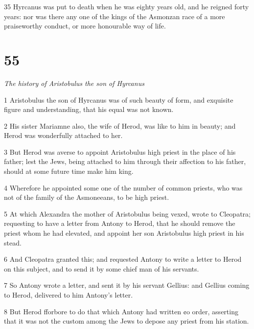 \par 35 Hyrcanus was put to death when he was eighty years old, and he reigned forty years: nor was there any one of the kings of the Asmonzan race of a more praiseworthy conduct, or more honourable way of life. 

\chapter{55}

\par \textit{The history of Aristobulus the son of Hyrcanus}

\par 1 Aristobulus the son of Hyrcanus was of such beauty of form, and exquisite figure and understanding, that his equal was not known. 

\par 2 His sister Mariamne also, the wife of Herod, was like to him in beauty; and Herod was wonderfully attached to her. 

\par 3 But Herod was averse to appoint Aristobulus high priest in the place of his father; lest the Jews, being attached to him through their affection to his father, should at some future time make him king. 

\par 4 Wherefore he appointed some one of the number of common priests, who was not of the family of the Asmoneeans, to be high priest.

\par 5 At which Alexandra the mother of Aristobulus being vexed, wrote to Cleopatra; requesting to have a letter from Antony to Herod, that he should remove the priest whom he had elevated, and appoint her son Aristobulus high priest in his stead. 

\par 6 And Cleopatra granted this; and requested Antony to write a letter to Herod on this subject, and to send it by some chief man of his servants. 

\par 7 So Antony wrote a letter, and sent it by his servant Gellius: and Gellius coming to Herod, delivered to him Antony’s letter. 

\par 8 But Herod fforbore to do that which Antony had written ¢o order, asserting that it was not the custom among the Jews to depose any priest from his station. 

